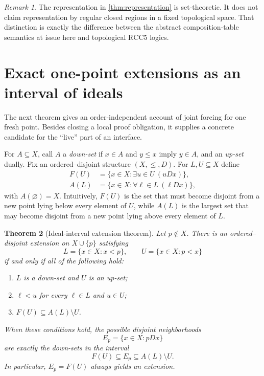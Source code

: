 \documentclass[11pt]{article}
\newtheorem{theorem}{Theorem}[section]
\theoremstyle{definition}
\theoremstyle{remark}
\newtheorem{remark}[theorem]{Remark}
\newcommand{\RCC}{\mathrm{RCC5}}
\begin{document}
\begin{remark}
The representation in \cref{thm:representation} is set-theoretic.  It does not claim representation by regular closed regions in a fixed topological space.  That distinction is exactly the difference between the abstract composition-table semantics at issue here and topological $\RCC$ logics.
\end{remark}

\section{Exact one-point extensions as an interval of ideals}

The next theorem gives an order-independent account of joint forcing for one fresh point.  Besides closing a local proof obligation, it supplies a concrete candidate for the ``live'' part of an interface.

For $A\subseteq X$, call $A$ a \emph{down-set} if $x\in A$ and $y\leq x$ imply $y\in A$, and an \emph{up-set} dually.  Fix an ordered--disjoint structure $(X,\leq,D)$.  For $L,U\subseteq X$ define
\begin{align*}
 F(U)&=\{x\in X: \exists u\in U\ (uDx)\},\\
 A(L)&=\{x\in X: \forall \ell\in L\ (\ell Dx)\},
\end{align*}
with $A(\varnothing)=X$.  Intuitively, $F(U)$ is the set that must become disjoint from a new point lying below every element of $U$, while $A(L)$ is the largest set that may become disjoint from a new point lying above every element of $L$.

\begin{theorem}[Ideal-interval extension theorem]\label{thm:extension}
Let $p\notin X$.  There is an ordered--disjoint extension on $X\cup\{p\}$ satisfying
\[
 L=\{x\in X:x<p\},\qquad
 U=\{x\in X:p<x\}
\]
if and only if all of the following hold:
\begin{enumerate}[label=(E\arabic*),leftmargin=3em]
\item $L$ is a down-set and $U$ is an up-set;
\item $\ell<u$ for every $\ell\in L$ and $u\in U$;
\item $F(U)\subseteq A(L)\setminus U$.
\end{enumerate}
When these conditions hold, the possible disjoint neighborhoods
\[
 E_p=\{x\in X:pDx\}
\]
are exactly the down-sets in the interval
\[
  F(U)\subseteq E_p\subseteq A(L)\setminus U.\tag{\(*\)}
\]
In particular, $E_p=F(U)$ always yields an extension.
\end{theorem}
\end{document}
